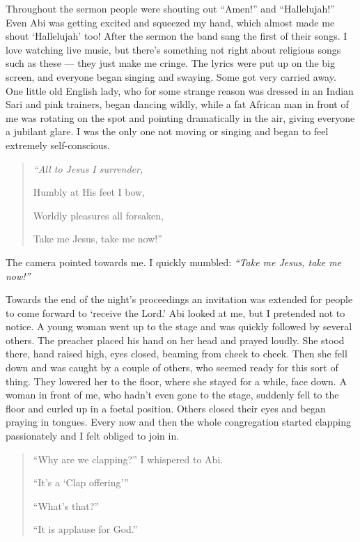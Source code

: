 \documentclass[12pt]{memoir}
\def\–{-\hskip0pt}
\begin{document}
Throughout the sermon people were shouting out “Amen!” and “Hallelujah!”
Even Abi was getting excited and squeezed my hand,
which almost made me shout ‘Hallelujah’ too!
After the sermon the band sang the first of their songs.
I love watching live music,
but there’s something not right about religious songs such as these —
they just make me cringe.
The lyrics were put up on the big screen,
and everyone began singing and swaying.
Some got very carried away.
One little old English lady,
who for some strange reason was dressed in an Indian Sari and pink trainers,
began dancing wildly, while a fat African man in front of me
was rotating on the spot and pointing dramatically in the air,
giving everyone a jubilant glare.
I was the only one not moving or singing
and began to feel extremely self\–conscious.

\begin{quote}
\itshape
“All to Jesus I surrender,

Humbly at His feet I bow,

Worldly pleasures all forsaken,

Take me Jesus, take me now!”
\end{quote}

The camera pointed towards me.
I quickly mumbled: \emph{“Take me Jesus, take me now!”}

Towards the end of the night’s proceedings an invitation was extended
for people to come forward to ‘receive the Lord.’
Abi looked at me, but I pretended not to notice.
A young woman went up to the stage and was quickly followed by several others.
The preacher placed his hand on her head and prayed loudly.
She stood there, hand raised high, eyes closed, beaming from cheek to cheek.
Then she fell down and was caught by a couple of others,
who seemed ready for this sort of thing.
They lowered her to the floor, where she stayed for a while, face down.
A woman in front of me, who hadn’t even gone to the stage,
suddenly fell to the floor and curled up in a foetal position.
Others closed their eyes and began praying in tongues.
Every now and then the whole congregation started clapping passionately
and I felt obliged to join in.

\begin{quote}
“Why are we clapping?” I whispered to Abi.

“It’s a ‘Clap offering’”

“What’s that?”

“It is applause for God.”
\end{quote}
\end{document}
